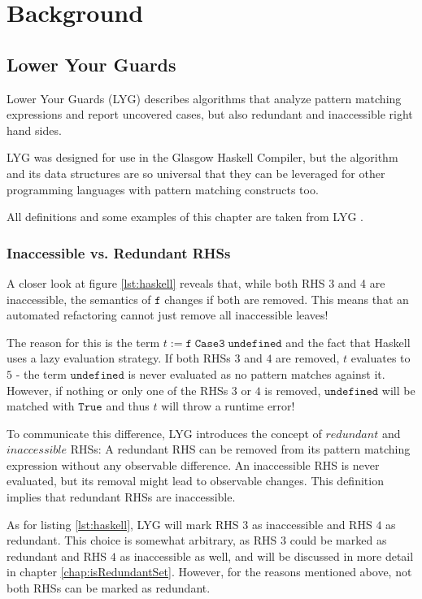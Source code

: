 \chapter{Background}\label{sec:background}

\section{Lower Your Guards}

Lower Your Guards (LYG) \cite{10.1145/3408989} describes algorithms that analyze pattern matching expressions and report uncovered cases, but also redundant and inaccessible right hand sides.

LYG was designed for use in the Glasgow Haskell Compiler,
but the algorithm and its data structures are so universal
that they can be leveraged for other programming languages with pattern matching constructs too.

All definitions and some examples of this chapter are taken from LYG \cite{10.1145/3408989}.

\subsection{Inaccessible vs. Redundant RHSs}

A closer look at figure \ref{lst:haskell} reveals that, while both RHS 3 and 4 are inaccessible,
the semantics of $\mathtt{f}$ changes if both are removed.
This means that an automated refactoring cannot just remove all inaccessible leaves!

The reason for this is the term $t := \mathtt{f}\;\mathtt{Case3}\;\mathtt{undefined}$ and the fact that Haskell uses a lazy evaluation strategy.
If both RHSs $3$ and $4$ are removed, $t$ evaluates to $5$ - the term $\mathtt{undefined}$ is never evaluated as no pattern matches against it.
However, if nothing or only one of the RHSs $3$ or $4$ is removed, $\mathtt{undefined}$ will be matched with $\mathtt{True}$ and thus $t$ will throw a runtime error!

To communicate this difference, LYG introduces the concept of $\mathit{redundant}$ and $\mathit{inaccessible}$ RHSs:
A redundant RHS can be removed from its pattern matching expression without any observable difference.
An inaccessible RHS is never evaluated, but its removal might lead to observable changes.
This definition implies that redundant RHSs are inaccessible.

As for listing \ref{lst:haskell}, LYG will mark RHS $3$ as inaccessible and RHS $4$ as redundant.
This choice is somewhat arbitrary, as RHS $3$ could be marked as redundant and RHS $4$ as inaccessible as well, and will be discussed in more detail in chapter \ref{chap:isRedundantSet}. However, for the reasons mentioned above, not both RHSs can be marked as redundant.

